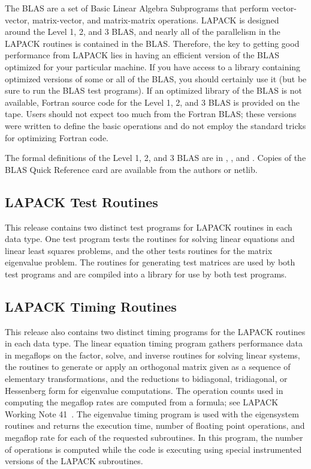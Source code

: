 \hspace{\parindent}
The BLAS are a set of Basic Linear Algebra Subprograms that perform
vector-vector, matrix-vector, and matrix-matrix operations. 
LAPACK is designed around the Level 1, 2, and 3 BLAS, and nearly all
of the parallelism in the LAPACK routines is contained in the BLAS.
Therefore,
the key to getting good performance from LAPACK lies in having an
efficient version of the BLAS optimized for your particular machine. 
If you have access to a library containing optimized versions of some
or all of the BLAS, you should certainly use it (but be sure to run
the BLAS test programs).
If an optimized library of the BLAS is not available,
Fortran source code for the Level 1, 2, and 3 BLAS
is provided on the tape.
Users should not expect too much from the Fortran BLAS; these versions
were written to define the basic operations and do not employ the
standard tricks for optimizing Fortran code.

The formal definitions of the Level 1, 2, and 3 BLAS
are in \cite{BLAS1}, \cite{BLAS2}, and \cite{BLAS3}. 
Copies of the BLAS Quick Reference card are available from the authors
or netlib.

\subsection{LAPACK Test Routines}

\hspace{\parindent}
This release contains two distinct test programs for LAPACK routines
in each data type.  One test program tests the routines for solving
linear equations and linear least squares problems,
and the other tests routines for the matrix eigenvalue problem.
The routines for generating test matrices are used by both test
programs and are compiled into a library for use by both test programs.

\subsection{LAPACK Timing Routines}

\hspace{\parindent}
This release also contains two distinct timing programs for the
LAPACK routines in each data type. 
The linear equation timing program gathers performance data in
megaflops on the factor, solve, and inverse routines for solving
linear systems, the routines to generate or apply an orthogonal matrix
given as a sequence of elementary transformations, and the reductions
to bidiagonal, tridiagonal, or Hessenberg form for eigenvalue
computations.
The operation counts used in computing the megaflop rates are computed
from a formula;
see LAPACK Working Note 41~\cite{WN41}.
The eigenvalue timing program is used with the eigensystem routines
and returns the execution time, number of floating point operations, and
megaflop rate for each of the requested subroutines.
In this program, the number of operations is computed while the
code is executing using special instrumented versions of the LAPACK
subroutines.


